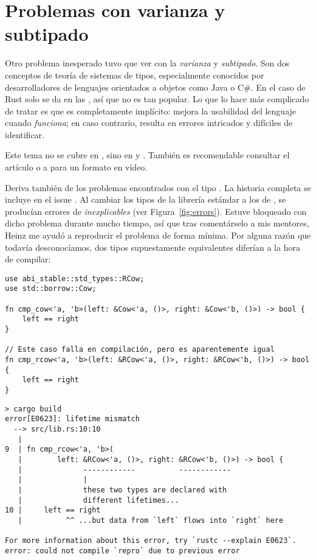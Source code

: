\chapter{Problemas con varianza y subtipado}\label{annex:covariance}

Otro problema inesperado tuvo que ver con la \emph{varianza} y \emph{subtipado}.
Son dos conceptos de teoría de sistemas de tipos, especialmente conocidos por
desarrolladores de lenguajes orientados a objetos como Java o C\#. En el caso de
Rust solo se da en las \lifetimes, así que no es tan popular. Lo que lo hace más
complicado de tratar es que es completamente implícito: mejora la usabilidad del
lenguaje cuando \emph{funciona}; en caso contrario, resulta en errores
intricados y difíciles de identificar.

Este tema no se cubre en \textcite{rustbook}, sino en \textcite[Subtyping and
Variance]{nomicon} y \textcite[Subtyping and Variance]{rustref}. También es
recomendable consultar el artículo \textcite{lcnr_covandcontra} o a
\textcite{video_covandcontra} para un formato en vídeo.

Deriva también de los problemas encontrados con el tipo . La
historia completa se incluye en el issue \textcite{abi_covandcontra}. Al cambiar
los tipos de la librería estándar a los de \abistable, se producían errores de
\lifetimes \emph{inexplicables} (ver Figura~\ref{fig:errors}). Estuve bloqueado
con dicho problema durante mucho tiempo, así que tras comentárselo a mis
mentores, Heinz me ayudó a reproducir el problema de forma mínima. Por alguna
razón que todavía desconocíamos, dos tipos supuestamente equivalentes diferían a
la hora de compilar:

\begin{verbatim}
use abi_stable::std_types::RCow;
use std::borrow::Cow;

fn cmp_cow<'a, 'b>(left: &Cow<'a, ()>, right: &Cow<'b, ()>) -> bool {
    left == right
}

// Este caso falla en compilación, pero es aparentemente igual
fn cmp_rcow<'a, 'b>(left: &RCow<'a, ()>, right: &RCow<'b, ()>) -> bool {
    left == right
}
\end{verbatim}

\begin{verbatim}
> cargo build
error[E0623]: lifetime mismatch
  --> src/lib.rs:10:10
   |
9  | fn cmp_rcow<'a, 'b>(
   |        left: &RCow<'a, ()>, right: &RCow<'b, ()>) -> bool {
   |              ------------          ------------
   |              |
   |              these two types are declared with
   |              different lifetimes...
10 |     left == right
   |          ^^ ...but data from `left` flows into `right` here

For more information about this error, try `rustc --explain E0623`.
error: could not compile `repro` due to previous error
\end{verbatim}


